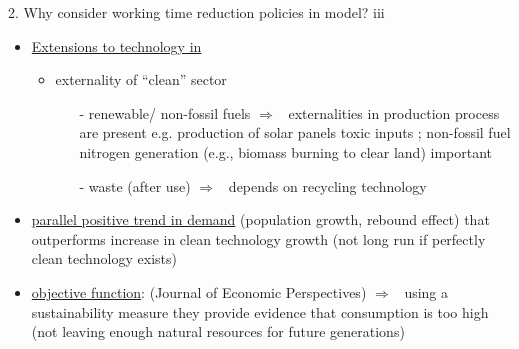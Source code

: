 \documentclass[11pt,aspectratio=169]{beamer}
\newcommand{\ar}{$\Rightarrow$ \ }
\begin{document}
\begin{frame}{2. Why consider working time reduction policies in model? iii}
\begin{itemize}
\item \underline{Extensions to technology in \cite{Acemoglu2012TheChange} }
\begin{itemize}
\item externality of ``clean'' sector \citep[see also][]{Dasgupta2021, Brock2005ChapterEmpirics}
\begin{itemize}
	\item[-] renewable/ non-fossil fuels \ar externalities in production process are present e.g. production of solar panels toxic inputs \citep{Yue2014DomesticAnalysis}; non-fossil fuel nitrogen generation (e.g., biomass burning to clear land) important \citep{Song2021ImportantEmissions} 
	\item[-] waste (after use) \ar depends on recycling technology %
\end{itemize}

\end{itemize}
\item \underline{parallel positive trend in demand} (population growth, rebound effect) that outperforms increase in clean technology growth \small{(not long run if perfectly clean technology exists)}
\item \normalsize{\underline{objective function}:} \cite{Arrow2004AreMuch}(Journal of Economic Perspectives) \ar using a sustainability measure they provide evidence that consumption is too high (not leaving enough natural resources for future generations)
\end{itemize}
\end{frame}


%	
%	
\end{document}
